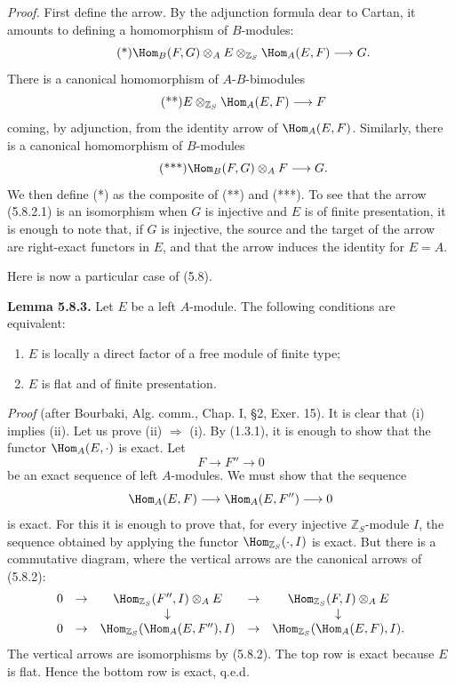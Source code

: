\documentclass[11pt]{article}
\begin{document}
\emph{Proof.} First define the arrow. By the adjunction formula dear to Cartan, it amounts to defining a homomorphism of \(B\)-modules:
\begin{equation}\tag{*}
  \Hom_B(F,G)\otimes_A E\otimes_{\mathbb Z_S}\Hom_A(E,F)
  \longrightarrow G.
\end{equation}
There is a canonical homomorphism of \(A\)-\(B\)-bimodules
\begin{equation}\tag{**}
  E\otimes_{\mathbb Z_S}\Hom_A(E,F)
  \longrightarrow F
\end{equation}
coming, by adjunction, from the identity arrow of \(\Hom_A(E,F)\). Similarly, there is a canonical homomorphism of \(B\)-modules
\begin{equation}\tag{***}
  \Hom_B(F,G)\otimes_A F\longrightarrow G.
\end{equation}
We then define (*) as the composite of (**) and (***). To see that the arrow (5.8.2.1) is an isomorphism when \(G\) is injective and \(E\) is of finite presentation, it is enough to note that, if \(G\) is injective, the source and the target of the arrow are right-exact functors in \(E\), and that the arrow induces the identity for \(E=A\).

Here is now a particular case of (5.8).

\textbf{Lemma 5.8.3.} Let \(E\) be a left \(A\)-module. The following conditions are equivalent:
\begin{enumerate}[label=(\roman*)]
\item \(E\) is locally a direct factor of a free module of finite type;
\item \(E\) is flat and of finite presentation.
\end{enumerate}

\emph{Proof} (after Bourbaki, Alg. comm., Chap. I, §2, Exer. 15). It is clear that (i) implies (ii). Let us prove (ii) \(\Rightarrow\) (i). By (1.3.1), it is enough to show that the functor \(\Hom_A(E,\cdot)\) is exact. Let
\[
  F\longrightarrow F''\longrightarrow 0
\]
be an exact sequence of left \(A\)-modules. We must show that the sequence
\[
  \Hom_A(E,F)\longrightarrow \Hom_A(E,F'')\longrightarrow 0
\]
is exact. For this it is enough to prove that, for every injective \(\mathbb Z_S\)-module \(I\), the sequence obtained by applying the functor \(\Hom_{\mathbb Z_S}(\cdot,I)\) is exact. But there is a commutative diagram, where the vertical arrows are the canonical arrows of (5.8.2):
\[
\begin{array}{ccccccccc}
0&\to&\Hom_{\mathbb Z_S}(F'',I)\otimes_A E&\to&\Hom_{\mathbb Z_S}(F,I)\otimes_A E\\
&&\downarrow&&\downarrow\\
0&\to&\Hom_{\mathbb Z_S}(\Hom_A(E,F''),I)&\to&\Hom_{\mathbb Z_S}(\Hom_A(E,F),I).
\end{array}
\]
The vertical arrows are isomorphisms by (5.8.2). The top row is exact because \(E\) is flat. Hence the bottom row is exact, q.e.d.
\end{document}
